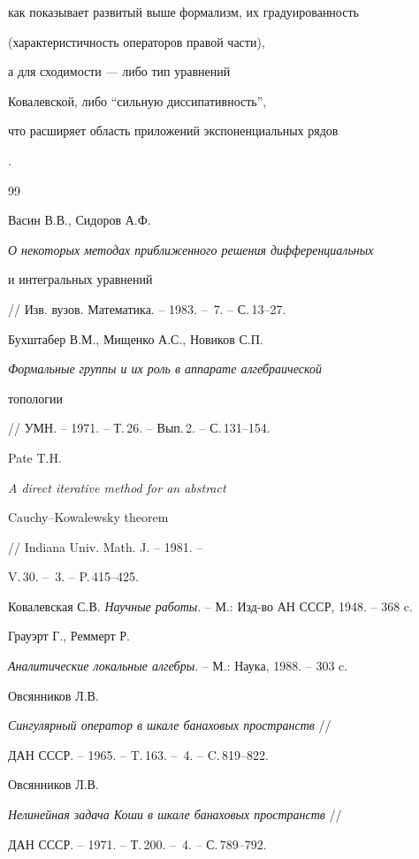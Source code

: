 как показывает развитый выше формализм, их градуированность


(характеристичность операторов правой части),


а для сходимости --- либо тип уравнений


Ковалевской, либо ``сильную диссипативность'',


что расширяет область приложений экспоненциальных рядов


\cite{SidorovKorzuninFilimonov}.





\begin{thebibliography}{99}


 Васин В.В., Сидоров А.Ф.


{\em О некоторых методах приближенного решения дифференциальных


и интегральных уравнений}


// Изв. вузов. Математика. -- 1983. -- \No\,7. -- С.\,13--27.


 Бухштабер В.М., Мищенко А.С., Новиков С.П.


{\em Формальные группы и их роль в аппарате алгебраической


топологии} // УМН. -- 1971. -- Т.\,26. -- Вып.\,2. -- С.\,131--154.


 Pate T.H.


{\em A direct iterative method for an abstract


Cauchy--Kowalewsky theorem} // Indiana Univ. Math. J. -- 1981. --


V.\,30. -- \No\,3. -- P.\,415--425.




Ковалевская С.В. {\em Научные работы}. -- М.: Изд-во АН СССР, 1948. -- 368 c.


 Грауэрт Г., Реммерт Р.


{\em Аналитические локальные алгебры}. -- М.: Наука, 1988. -- 303 c.


 Овсянников Л.В.


{\em Сингулярный оператор в шкале банаховых пространств} //


ДАН СССР. -- 1965. -- T.\,163. -- \No\,4. -- C.\,819--822.


 Овсянников Л.В.


{\em Нелинейная задача Коши в шкале банаховых пространств} //


ДАН СССР. -- 1971. -- Т.\,200. -- \No\,4. -- С.\,789--792.



\end{thebibliography}
